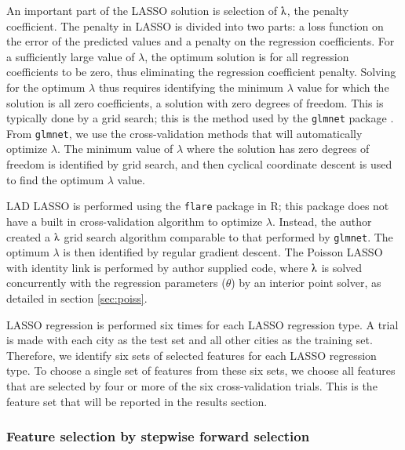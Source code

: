 \documentclass[11pt]{article}
\begin{document}

An important part of the LASSO solution is selection of $\lambdaup$, the penalty coefficient. The penalty in LASSO is divided into two parts: a loss function on the error of the predicted values and a penalty on the regression coefficients. For a sufficiently large value of $\lambda$, the optimum solution is for all regression coefficients to be zero, thus eliminating the regression coefficient penalty. Solving for the optimum $\lambda$ thus requires identifying the minimum $\lambda$ value for which the solution is all zero coefficients, a solution with zero degrees of freedom. This is typically done by a grid search; this is the method used by the \texttt{glmnet} package \cite{friedman2010}. From \texttt{glmnet}, we use the cross-validation methods that will automatically optimize $\lambda$. The minimum value of $\lambda$ where the solution has zero degrees of freedom is identified by grid search, and then cyclical coordinate descent is used to find the optimum $\lambda$ value. 

LAD LASSO is performed using the \texttt{flare} package in R; this package does not have a built in cross-validation algorithm to optimize $\lambda$. Instead, the author created a $\lambdaup$ grid search algorithm comparable to that performed by \texttt{glmnet}. The optimum $\lambda$ is then identified by regular gradient descent. The Poisson LASSO with identity link is performed by author supplied code, where $\lambdaup$ is solved concurrently with the regression parameters ($\theta$) by an interior point solver, as detailed in section \ref{sec:poiss}.

LASSO regression is performed six times for each LASSO regression type. A trial is made with each city as the test set and all other cities as the training set. Therefore, we identify six sets of selected features for each LASSO regression type. To choose a single set of features from these six sets, we choose all features that are selected by four or more of the six cross-validation trials. This is the feature set that will be reported in the results section.

\subsubsection{Feature selection by stepwise forward selection}\label{sec:fs}
 
\end{document}
